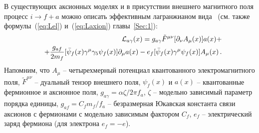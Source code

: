  В существующих аксионных моделях и в присутствии 
внешнего магнитного поля процесс  $i \to f+a$ 
можно описать эффективным лагранжианом вида~\cite{Raffelt:1996} 
(см. также формулы~(\ref{eq:Lel}) и~(\ref{eq:Laxion}) главы~\ref{Sec:1}):
%
\begin{eqnarray}
\label{eq:L1}
&&{\cal L}_{a\gamma}(x) = g_{a\gamma}\tilde F^{\mu \nu} [\partial_{\nu}A_{\mu}(x)] a(x) + 
\\
\nonumber
&& + \frac{g_{af}}{2m_f} 
[\bar \psi_f(x) \gamma^{\mu} \gamma_5 \psi_f(x)] \partial_{\mu} a(x) - 
 e_f[\bar \psi_f(x) \gamma^{\mu} \psi_f(x)]A_{\mu}(x) \, .
\end{eqnarray}
%
\noindent Напомним, что  $A_{\mu}$ -- четырехмерный потенциал квантованного электромагнитного
поля, $\tilde F^{\mu \nu}$ --  дуальный тензор внешнего поля,  $\psi_f(x)$  и $a(x)$ --  
квантованные фермионное и аксионное поля, 
  $g_{a\gamma} = \alpha \zeta/2\pi f_a$, $\zeta$ --  модельно зависимый 
параметр порядка единицы, 
$g_{af} = C_f m_f/f_a$ -- безразмерная Юкавская константа связи аксионов с 
фермионами с модельно зависимым фактором $C_f$, $e_f$ -- электрический заряд 
фермиона (для электрона $e_f = - e$). 

